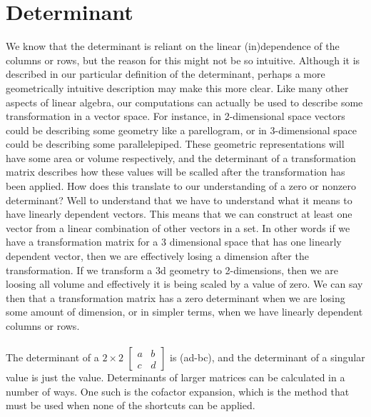 \documentclass{report}
\begin{document}
\section{Determinant}
\noindent We know that the determinant is reliant on the linear (in)dependence of the columns or rows, but the reason for this might not be so intuitive. Although it is described in our particular definition of the determinant, perhaps a more geometrically intuitive description may make this more clear. Like many other aspects of linear algebra, our computations can actually be used to describe some transformation in a vector space. For instance, in 2-dimensional space vectors could be describing some geometry like a parellogram, or in 3-dimensional space could be describing some parallelepiped. These geometric representations will have some area or volume respectively, and the determinant of a transformation matrix describes how these values will be scalled after the transformation has been applied. How does this translate to our understanding of a zero or nonzero determinant? Well to understand that we have to understand what it means to have linearly dependent vectors. This means that we can construct at least one vector from a linear combination of other vectors in a set. In other words if we have a transformation matrix for a 3 dimensional space that has one linearly dependent vector, then we are effectively losing a dimension after the transformation. If we transform a 3d geometry to 2-dimensions, then we are loosing all volume and effectively it is being scaled by a value of zero. We can say then that a transformation matrix has a zero determinant when we are losing some amount of dimension, or in simpler terms, when we have linearly dependent columns or rows. \\
\\
\noindent The determinant of a $2\times2$ $\begin{bmatrix}a&b\\c&d\end{bmatrix}$ is (ad-bc), and the determinant of a singular value is just the value. Determinants of larger matrices can be calculated in a number of ways. One such is the cofactor expansion, which is the method that must be used when none of the shortcuts can be applied.
\end{document}
